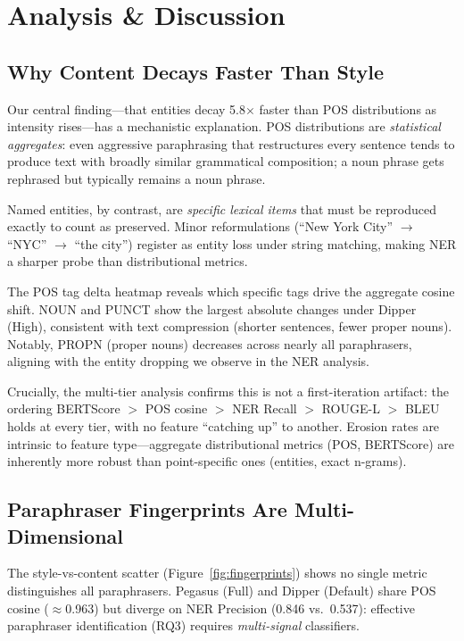\section{Analysis \& Discussion}

\subsection{Why Content Decays Faster Than Style}

Our central finding---that entities decay 5.8$\times$ faster than POS distributions as intensity rises---has a mechanistic explanation. POS distributions are \emph{statistical aggregates}: even aggressive paraphrasing that restructures every sentence tends to produce text with broadly similar grammatical composition; a noun phrase gets rephrased but typically remains a noun phrase.

Named entities, by contrast, are \emph{specific lexical items} that must be reproduced exactly to count as preserved. Minor reformulations (``New York City'' $\rightarrow$ ``NYC'' $\rightarrow$ ``the city'') register as entity loss under string matching, making NER a sharper probe than distributional metrics.

The POS tag delta heatmap reveals which specific tags drive the aggregate cosine shift. NOUN and PUNCT show the largest absolute changes under Dipper (High), consistent with text compression (shorter sentences, fewer proper nouns). Notably, PROPN (proper nouns) decreases across nearly all paraphrasers, aligning with the entity dropping we observe in the NER analysis.

Crucially, the multi-tier analysis confirms this is not a first-iteration artifact: the ordering BERTScore $>$ POS cosine $>$ NER Recall $>$ ROUGE-L $>$ BLEU holds at every tier, with no feature ``catching up'' to another. Erosion rates are intrinsic to feature type---aggregate distributional metrics (POS, BERTScore) are inherently more robust than point-specific ones (entities, exact n-grams).

\subsection{Paraphraser Fingerprints Are Multi-Dimensional}

The style-vs-content scatter (Figure~\ref{fig:fingerprints}) shows no single metric distinguishes all paraphrasers. Pegasus (Full) and Dipper (Default) share POS cosine ($\approx$0.963) but diverge on NER Precision (0.846 vs.\ 0.537): effective paraphraser identification (RQ3) requires \emph{multi-signal} classifiers.

